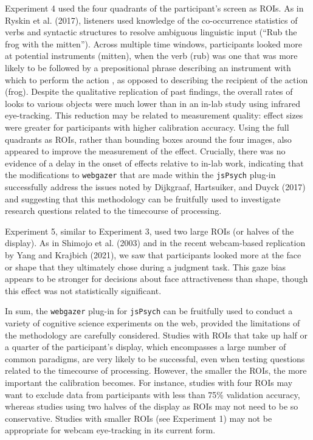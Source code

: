 \documentclass[
  man,floatsintext]{apa6}
\begin{document}
Experiment 4 used the four quadrants of the participant's screen as ROIs. As in Ryskin et al. (2017), listeners used knowledge of the co-occurrence statistics of verbs and syntactic structures to resolve ambiguous linguistic input (``Rub the frog with the mitten''). Across multiple time windows, participants looked more at potential instruments (mitten), when the verb (rub) was one that was more likely to be followed by a prepositional phrase describing an instrument with which to perform the action , as opposed to describing the recipient of the action (frog). Despite the qualitative replication of past findings, the overall rates of looks to various objects were much lower than in an in-lab study using infrared eye-tracking. This reduction may be related to measurement quality: effect sizes were greater for participants with higher calibration accuracy. Using the full quadrants as ROIs, rather than bounding boxes around the four images, also appeared to improve the measurement of the effect. Crucially, there was no evidence of a delay in the onset of effects relative to in-lab work, indicating that the modifications to \texttt{webgazer} that are made within the \texttt{jsPsych} plug-in successfully address the issues noted by Dijkgraaf, Hartsuiker, and Duyck (2017) and suggesting that this methodology can be fruitfully used to investigate research questions related to the timecourse of processing.

Experiment 5, similar to Experiment 3, used two large ROIs (or halves of the display). As in Shimojo et al. (2003) and in the recent webcam-based replication by Yang and Krajbich (2021), we saw that participants looked more at the face or shape that they ultimately chose during a judgment task. This gaze bias appears to be stronger for decisions about face attractiveness than shape, though this effect was not statistically significant.

In sum, the \texttt{webgazer} plug-in for \texttt{jsPsych} can be fruitfully used to conduct a variety of cognitive science experiments on the web, provided the limitations of the methodology are carefully considered. Studies with ROIs that take up half or a quarter of the participant's display, which encompasses a large number of common paradigms, are very likely to be successful, even when testing questions related to the timecourse of processing. However, the smaller the ROIs, the more important the calibration becomes. For instance, studies with four ROIs may want to exclude data from participants with less than 75\% validation accuracy, whereas studies using two halves of the display as ROIs may not need to be so conservative. Studies with smaller ROIs (see Experiment 1) may not be appropriate for webcam eye-tracking in its current form.
\end{document}

